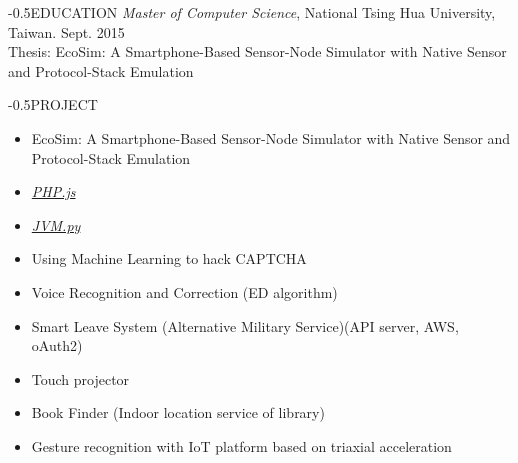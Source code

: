\documentclass{res}
\makeatletter
\renewcommand{\section}{\@startsection{section}{1}{0mm}
  {-\baselineskip}{0.5\baselineskip}{\bf\leftline}}
\makeatother
\begin{document}
\begin{resume}
			\section{EDUCATION}
			\vspace{-0.20in}
				{\sl Master of Computer Science}, National Tsing Hua University, Taiwan. \hfill Sept. 2015\\
				{\footnotesize Thesis: EcoSim: A Smartphone-Based Sensor-Node Simulator with Native Sensor and Protocol-Stack Emulation}





			\section{PROJECT}
			\vspace{-0.1in}
			\begin{itemize}

					\item EcoSim: A Smartphone-Based Sensor-Node Simulator with Native Sensor and Protocol-Stack Emulation
					\vspace{-0.05in}

					\item \href{https://github.com/backman-git/Interpreter.js}{\sl PHP.js}
					\vspace{-0.05in}

					\item \href{https://github.com/backman-git/JVM.py}{\sl JVM.py}
					\vspace{-0.05in}

					\item Using Machine Learning to hack CAPTCHA
					\vspace{-0.05in}

					\item Voice Recognition and Correction (ED algorithm)
					\vspace{-0.05in}

					\item Smart Leave System (Alternative Military Service)(API server, AWS, oAuth2)
					\vspace{-0.05in}

					\item Touch projector
					\vspace{-0.05in}

					\item Book Finder (Indoor location service of library)
					\vspace{-0.05in}

					\item Gesture recognition with IoT platform based on triaxial acceleration
					\vspace{-0.05in}

			\end{itemize}


		\end{resume}
	
\end{document}
